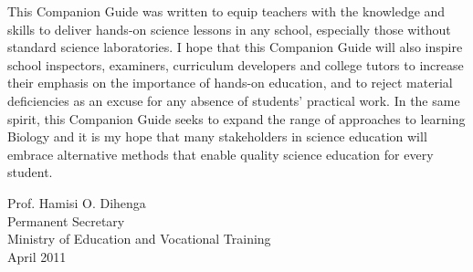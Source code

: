 This Companion Guide was written to equip teachers with the knowledge and skills to deliver hands-on science lessons in any school, especially those without standard science laboratories. I hope that this Companion Guide will also inspire school inspectors, examiners, curriculum developers and college tutors to increase their emphasis on the importance of hands-on education, and to reject material deficiencies as an excuse for any absence of students' practical work. In the same spirit, this Companion Guide seeks to expand the range of approaches to learning Biology and it is my hope that many stakeholders in science education will embrace alternative methods that enable quality science education for every student.\\[40pt]
\begin{figure}[h!]
\def\svgwidth{200pt}

\end{figure}
\vspace{-20pt}
\begin{flushleft}
Prof. Hamisi O. Dihenga\\
Permanent Secretary\\
Ministry of Education and Vocational Training\\
April 2011
\end{flushleft}